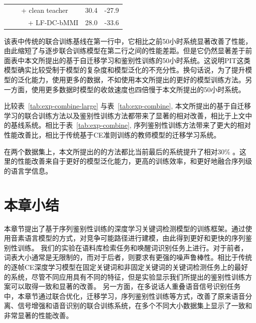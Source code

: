 \begin{table}[thbp!]
{\begin{tabular}{ c m{}||c c}
        &\ \ + clean teacher& 30.4& -27.9 \\
        &\ \ \ \ + LF-DC-bMMI& 28.0 & -33.6 \\ 
      \hline
    \end{tabular}
  }
\end{table}

该表中传统的联合训练基线在第一行中，它相比之前50小时系统显著改善了性能，由此缩短了与逐步联合训练模型在第二行之间的性能差距。但是它仍然显著差于前面表中本文所提出的基于自迁移学习和鉴别性训练的50小时系统。这说明PIT这类模型确实比较受制于模型的复杂度和模型泛化的不充分性。换句话说，为了提升模型的泛化能力，使用更多的数据，不如使用本文所提出的更好的模型训练方法。另一方面，使用更多数据时模型的收敛速度也四倍慢于本文所提出的50小时系统。

比较表~\ref{tab:exp-combine-large} 与表~\ref{tab:exp-combine},  本文所提出的基于自迁移学习的联合训练方法以及鉴别性训练方法都带来了显著的相对改善，相比于上文中的基线系统。相比于表~\ref{tab:exp-combine}, 序列鉴别性训练方法带来了更大的相对性能改善比，相比于传统基于CE准则训练的教师模型的迁移学习系统。

在两个数据集上，本文所提出的的方法都比当前最后的系统提升了相对30\% 。这里的性能改善来自于更好的模型泛化能力，更高的训练效率，和更好地融合序列级的语言学信息。




\section{本章小结}
\label{chap:kws-sum}

本章节提出了基于序列鉴别性训练的深度学习关键词检测模型的训练框架。通过使用音素语言模型的方式，对竞争可能路径进行建模，由此得到更好和更快的序列鉴别性训练。
我们的实验在语料库检索任务和唤醒词识别任务上进行。对于前者，词表大小通常是无限制的，而对于后者，则要求有更强的噪声鲁棒性。相比于传统的逐帧CE深度学习模型在固定关键词和非固定关键词的关键词检测任务上的最好的系统，尽管不同应用具有不同的特征，但是实验显示我们所提出的鉴别性训练方案可以取得一致和显著的改善。
%
另一方面，在多说话人重叠语音信号识别任务中，本章节通过联合优化，迁移学习，序列鉴别性训练等方式，改善了原来语音分离、信号增强和语音识别的联合训练系统，在多个不同大小数据集上显示了一致和非常显著的性能改善。
